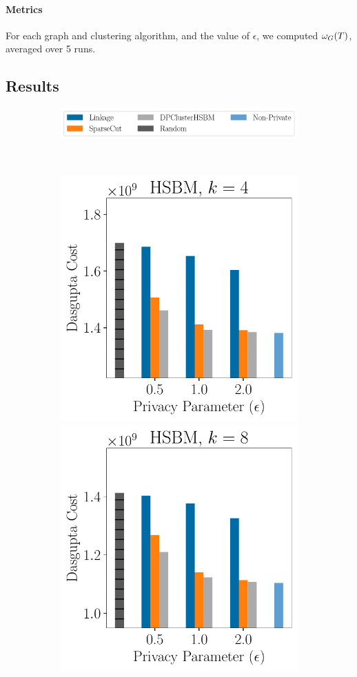 \paragraph{Metrics}
For each graph and clustering algorithm, and the value of $\epsilon$, we computed $\omega_G(T)$, averaged over 5 runs.

\subsection{Results}\label{chap5-sec:exp-discuss}
\begin{figure}
    \begin{subfigure}[b]{\linewidth}
            \centering\includegraphics[width=0.8\linewidth]{plots/legend.pdf}
    \end{subfigure}\\
    \begin{subfigure}[b]{\linewidth}
        \centering
        \includegraphics[width=0.48\linewidth]{plots/syn_2048_4_cost.pdf}
        \includegraphics[width=0.48\linewidth]{plots/syn_2048_8_cost.pdf}

\end{subfigure}
\end{figure}
